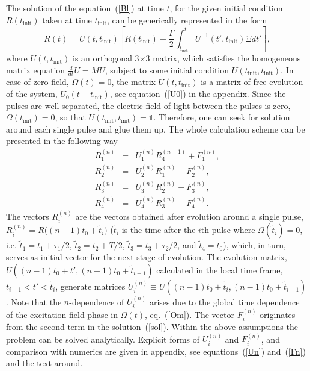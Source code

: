 \documentclass[prb,twocolumn,showpacs,epsfig,epsf]{revtex4}
\newcommand{\1}{\mathds{1}}
\begin{document}
The solution of the equation~(\ref{Bl}) at time $t$, for the given initial condition $R(t_{\mathrm{init}})$ taken at time $t_{\mathrm{init}}$, can be generically represented in the form~\cite{PY1990}
\begin{equation}\label{sol}
R(t)=U(t,t_{\mathrm{init}})\left[R(t_{\mathrm{init}})-\frac{\Gamma}{2}\int_{t_{\mathrm{init}}}^tU^{-1}(t',t_{\mathrm{init}})\Xi dt'\right ],
\end{equation}
where $U(t,t_{\mathrm{init}})$ is an orthogonal 3$\times$3 matrix, which satisfies the homogeneous matrix equation $\frac{d}{dt}U= M U$, subject to some initial condition $U(t_{\mathrm{init}},t_{\mathrm{init}})$. In case of zero field, $\Omega(t)=0$, the matrix $U(t,t_{\mathrm{init}})$ is a matrix of free evolution of the system, $U_0(t-t_{\mathrm{init}})$, see equation~(\ref{U0}) in the appendix. Since the pulses are well separated, the electric field of light between the pulses is zero, $\Omega(t_{\mathrm{init}})=0$, so that $U(t_{\mathrm{init}},t_{\mathrm{init}})=\1$.  Therefore, one can seek for solution around each single pulse and glue them up. The whole calculation scheme can be presented in the following way
\begin{eqnarray}\label{R1}
R_1^{(n)}&=&U^{(n)}_1 R_4^{(n-1)}+ F^{(n)}_1,\\
R_2^{(n)}&=&U^{(n)}_2 R_1^{(n)}+ F^{(n)}_2,\\
R_3^{(n)}&=&U^{(n)}_3 R_2^{(n)}+ F^{(n)}_3,\\
R_4^{(n)}&=&U^{(n)}_4 R_3^{(n)}+ F^{(n)}_4.\label{R4}
\end{eqnarray}
The vectors $R_i^{(n)}$ are the vectors obtained after evolution around a single pulse, $R_i^{(n)}=R\big((n-1)t_0+\tilde t_i\big)$ ($\tilde t_i$ is the time after the $i$th pulse where $\Omega(\tilde t_i)=0$, i.e. $\tilde t_1=t_1+\tau_1/2$, $\tilde t_2=t_2+T/2$, $\tilde t_3=t_3+\tau_2/2$, and $\tilde t_4=t_0$), which, in turn, serves as initial vector for the next stage of evolution. The evolution matrix, $U((n-1)t_0+t',(n-1)t_0+\tilde t_{i-1})$ calculated in the local time frame, $\tilde t_{i-1}<t'<\tilde t_i$, generate matrices $U^{(n)}_i\equiv U((n-1)t_0+\tilde t_i,(n-1)t_0+\tilde t_{i-1})$. Note that the $n$-dependence of $U^{(n)}_i$ arises due to the global time dependence of the excitation field phase in $\Omega(t)$, eq.~(\ref{Om}). The vector $F^{(n)}_i$ originates from the second term in the solution~(\ref{sol}). Within the above assumptions the problem can be solved analytically. Explicit forms of $U^{(n)}_i$ and  $F^{(n)}_i$, and comparison with numerics are given in appendix, see equations~(\ref{Un}) and~(\ref{Fn}) and the text around. 
\end{document}
